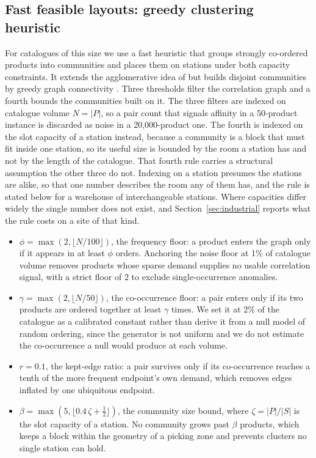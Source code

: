 \documentclass[]{interact}
\begin{document}
\subsection{Fast feasible layouts: greedy clustering heuristic}\label{sec:heuristic}
For catalogues of this size we use a fast heuristic that groups strongly co-ordered products into communities and places them on stations under both capacity constraints. It extends the agglomerative idea of \citet{chuang2016} but builds disjoint communities by greedy graph connectivity \citep{west2001introduction}. Three thresholds filter the correlation graph and a fourth bounds the communities built on it. The three filters are indexed on catalogue volume $N=|P|$, so a pair count that signals affinity in a 50-product instance is discarded as noise in a 20,000-product one. The fourth is indexed on the slot capacity of a station instead, because a community is a block that must fit inside one station, so its useful size is bounded by the room a station has and not by the length of the catalogue. That fourth rule carries a structural assumption the other three do not. Indexing on a station presumes the stations are alike, so that one number describes the room any of them has, and the rule is stated below for a warehouse of interchangeable stations. Where capacities differ widely the single number does not exist, and Section~\ref{sec:industrial} reports what the rule costs on a site of that kind.
\begin{itemize}
\item $\phi=\max(2,\lfloor N/100\rfloor)$, the frequency floor: a product enters the graph only if it appears in at least $\phi$ orders. Anchoring the noise floor at 1\% of catalogue volume removes products whose sparse demand supplies no usable correlation signal, with a strict floor of 2 to exclude single-occurrence anomalies.
\item $\gamma=\max(2,\lfloor N/50\rfloor)$, the co-occurrence floor: a pair enters only if its two products are ordered together at least $\gamma$ times. We set it at 2\% of the catalogue as a calibrated constant rather than derive it from a null model of random ordering, since the generator is not uniform and we do not estimate the co-occurrence a null would produce at each volume.
\item $r=0.1$, the kept-edge ratio: a pair survives only if its co-occurrence reaches a tenth of the more frequent endpoint's own demand, which removes edges inflated by one ubiquitous endpoint.
\item $\beta=\max\!\left(5,\big\lfloor 0.4\,\zeta+\tfrac12 \big\rfloor\right)$, the community size bound, where $\zeta=|P|/|S|$ is the slot capacity of a station. No community grows past $\beta$ products, which keeps a block within the geometry of a picking zone and prevents clusters no single station can hold.
\end{itemize}
\end{document}

